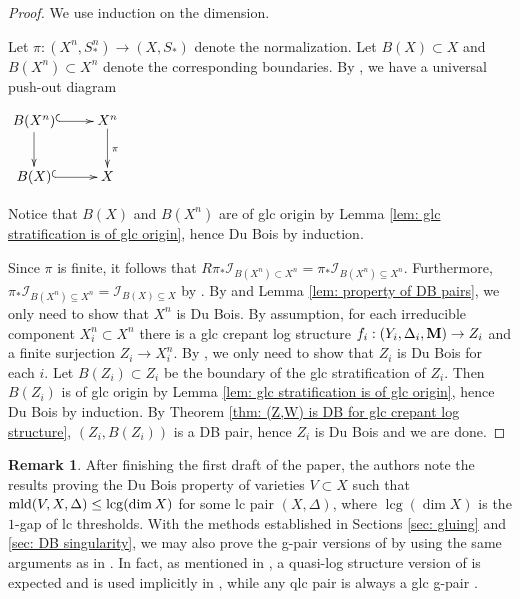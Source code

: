 \documentclass[11pt]{amsart}
\numberwithin{equation}{section}
\newcommand{\Mm}{{\bf{M}}}
\newcommand{\lcg}{\operatorname{lcg}}
\newcommand{\mld}{{\rm{mld}}}
\theoremstyle{definition}
\theoremstyle{definition}
\newtheorem{rem}[thm]{Remark}
\theoremstyle{definition}
\begin{document}
\begin{proof}
We use induction on the dimension.

Let $\pi: (X^n,S^n_*)\to (X,S_*)$ denote the normalization. Let $B(X)\subset X$ and
$B(X^n)\subset X^n$ denote the corresponding boundaries. By \cite[9.15.1]{Kol13}, we have a universal push-out diagram
\begin{center}
$\xymatrix{
B(X^n)\ar@{^(->}[r]\ar@{->}[d] & X^n\ar@{->}[d]^{\pi}\\
 B(X)\ar@{^(->}[r]& X\\
}$
\end{center}
Notice that $B(X)$ and $B(X^n)$ are of glc origin by Lemma \ref{lem: glc stratification is of glc origin}, hence Du Bois by induction.


Since $\pi$ is finite, it follows that $R\pi_*\mathcal{I}_{B(X^n)\subset X^n}=\pi_*\mathcal{I}_{B(X^n)\subseteq X^n}$. Furthermore, $\pi_*\mathcal{I}_{B(X^n)\subseteq X^n}=\mathcal{I}_{B(X)\subseteq X}$ by \cite[Theorem 9.30]{Kol13}. By \cite[Theorem 3.3]{Kov12} and Lemma \ref{lem: property of DB pairs}, we only need to show that $X^n$ is Du Bois. By assumption, for each irreducible component $X_i^n\subset X^n$ there is a glc crepant log structure $f_i:(Y_i,\Delta_i,\Mm)\to Z_i$ and a finite surjection $Z_i\to X_i^n$. By \cite[Corollary 2.5]{Kov99}, we only need to show that $Z_i$ is Du Bois for each $i$. Let $B(Z_i)\subset Z_i$ be the boundary of the glc stratification of $Z_i$. Then  $B(Z_i)$ is of glc origin by Lemma \ref{lem: glc stratification is of glc origin}, hence Du Bois by induction. By Theorem \ref{thm: (Z,W) is DB for glc crepant log structure}, $(Z_i,B(Z_i))$ is a DB pair, hence $Z_i$ is Du Bois and we are done.
\end{proof}

\begin{rem}
After finishing the first draft of the paper, the authors note the results \cite[Theorems 1,12]{KK22} proving the Du Bois property of varieties $V\subset X$ such that $\mld(V,X,\Delta)\leq\lcg(\dim X)$ for some lc pair $(X,\Delta)$, where $\lcg(\dim X)$ is the $1$-gap of lc thresholds. With the methods established in Sections \ref{sec: gluing} and \ref{sec: DB singularity}, we may also prove the g-pair versions of \cite[Theorems 1,12]{KK22} by using the same arguments as in \cite{KK22}. In fact, as mentioned in \cite[Proof of Theorems 1 and 12]{KK22}, a quasi-log structure \cite{Fuj17} version of \cite[Theorems 1,12]{KK22} is expected and is used implicitly in \cite[Proof of Proposition 16]{KK22}, while any qlc pair is always a glc g-pair \cite[Remark 1.9]{Fuj22}.
\end{rem}
\end{document}
